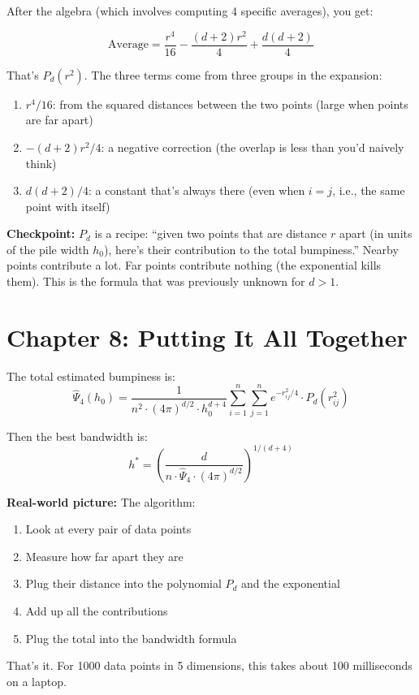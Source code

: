 \documentclass[12pt]{article}
\newcommand{\realworld}[1]{\begin{tcolorbox}[colback=green!5,colframe=green!50!black,breakable]\textbf{Real-world picture:} #1\end{tcolorbox}}
\newcommand{\checkpoint}[1]{\begin{tcolorbox}[colback=purple!5,colframe=purple!50!black,breakable]\textbf{Checkpoint:} #1\end{tcolorbox}}
\begin{document}
After the algebra (which involves computing 4 specific averages), you get:

$$\text{Average} = \frac{r^4}{16} - \frac{(d+2) r^2}{4} + \frac{d(d+2)}{4}$$

That's $P_d(r^2)$. The three terms come from three groups in the expansion:
\begin{enumerate}
\item $r^4/16$: from the squared distances between the two points (large when points are far apart)
\item $-(d+2)r^2/4$: a negative correction (the overlap is less than you'd naively think)
\item $d(d+2)/4$: a constant that's always there (even when $i = j$, i.e., the same point with itself)
\end{enumerate}

\checkpoint{$P_d$ is a recipe: ``given two points that are distance $r$ apart (in units of the pile width $h_0$), here's their contribution to the total bumpiness.'' Nearby points contribute a lot. Far points contribute nothing (the exponential kills them). This is the formula that was previously unknown for $d > 1$.}

\section{Chapter 8: Putting It All Together}

The total estimated bumpiness is:
$$\hat\Psi_4(h_0) = \frac{1}{n^2 \cdot (4\pi)^{d/2} \cdot h_0^{d+4}} \sum_{i=1}^n \sum_{j=1}^n e^{-r_{ij}^2/4} \cdot P_d(r_{ij}^2)$$

Then the best bandwidth is:
$$h^* = \left(\frac{d}{n \cdot \hat\Psi_4 \cdot (4\pi)^{d/2}}\right)^{1/(d+4)}$$

\realworld{
The algorithm:
\begin{enumerate}
\item Look at every pair of data points
\item Measure how far apart they are
\item Plug their distance into the polynomial $P_d$ and the exponential
\item Add up all the contributions
\item Plug the total into the bandwidth formula
\end{enumerate}
That's it. For 1000 data points in 5 dimensions, this takes about 100 milliseconds on a laptop.
}
\end{document}
